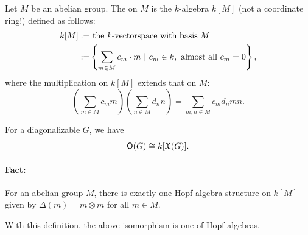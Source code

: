\begin{definition}
Let $M$ be an abelian group. The  on $M$ is the $k$-algebra $k[M]$ (not a coordinate ring!) defined as follows:
\begin{align*}
k[M] := & \text{ the }k\text{-vectorspace with basis }M\\
:= & \left\lbrace \sum_{m \in M} c_m \cdot m  ~ | ~ c_m \in k, \text{ almost all }c_m = 0\right\rbrace,
\end{align*}
where the multiplication on $k[M]$ extends that on $M$:
\[ (\sum_{m\in M}c_m m) (\sum_{n\in M} d_n n) = \sum_{m,n \in M} c_md_n mn. \]
\end{definition}
\begin{corollary}
	For a diagonalizable $G$, we have
	\[ \mathsf{O}(G) \overset{}{\cong} k[\mathfrak{X}(G)]. \]
\end{corollary}

\paragraph{Fact:} For an abelian group $M$, there is exactly one Hopf algebra structure on $k[M]$ given by $\Delta(m) = m\otimes m$ for all $m \in M$.

With this definition, the above isomorphism is one of Hopf algebras.

